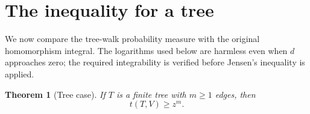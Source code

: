 \documentclass[11pt]{article}
\newtheorem{theorem}{Theorem}[section]
\begin{document}
\section{The inequality for a tree}

We now compare the tree-walk probability measure with the original
homomorphism integral.  The logarithms used below are harmless even when
$d$ approaches zero; the required integrability is verified before
Jensen's inequality is applied.

\begin{theorem}[Tree case]
\label{thm:tree}
If $T$ is a finite tree with $m\geq1$ edges, then
\[
t(T,V)\geq z^m.
\]
\end{theorem}
\end{document}
